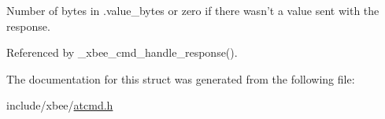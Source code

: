 Number of bytes in .value\-\_\-bytes or zero if there wasn't a value sent with the response. 



Referenced by \-\_\-xbee\-\_\-cmd\-\_\-handle\-\_\-response().



The documentation for this struct was generated from the following file\-:\begin{DoxyCompactItemize}
\item 
include/xbee/\hyperlink{atcmd_8h}{atcmd.\-h}\end{DoxyCompactItemize}
